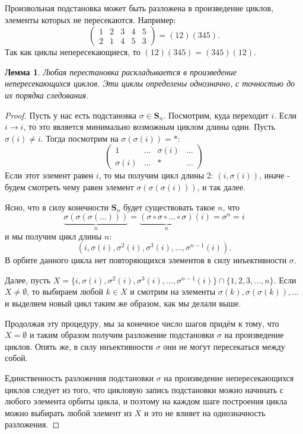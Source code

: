 \documentclass{article}
\newtheorem{lemma}{Лемма}[section]
\begin{document}
Произвольная подстановка может быть разложена в произведение циклов, элементы которых не пересекаются. Например:
\[
    \begin{pmatrix}
        1 & 2 & 3 & 4 & 5 \\
        2 & 1 & 4 & 5 & 3
    \end{pmatrix}
    = (12)(345).
\]
Так как циклы непересекающиеся, то $(12)(345) = (345)(12)$.

\begin{lemma} \label{qxtx}
    Любая перестановка раскладывается в произведение непересекающихся циклов. Эти циклы определены однозначно, с точностью до их порядка следования.
\end{lemma}
\begin{proof}
    Пусть у нас есть подстановка $\sigma \in \mathbf{S}_n$. Посмотрим, куда переходит $i$. Если $i \rightarrow i$, то это является минимально возможным циклом длины один. Пусть $\sigma(i) \neq i$. Тогда посмотрим на $\sigma(\sigma(i)) = *$:
    \[
        \begin{pmatrix}
            1 & \dots & \sigma(i) & \dots  \\
            \sigma(i) & \dots & * & \dots
        \end{pmatrix}
    \]
    Если этот элемент равен $i$, то мы получим цикл длины 2: $(i, \sigma(i))$, иначе - будем смотреть чему равен элемент $\sigma(\sigma(\sigma(i)))$, и так далее.

    Ясно, что в силу конечности $\textbf{S}_n$ будет существовать такое $n$, что $$ \underbrace{\sigma(\sigma(\sigma( \ldots )))}_{n} = \underbrace{(\sigma \circ \sigma \circ \ldots \circ \sigma)}_{n}(i) = \sigma^n = i $$ и мы получим цикл длины $n$: $$ (i, \sigma(i), \sigma^2(i), \sigma^3(i), \ldots, \sigma^{n - 1}(i)). $$
    В орбите данного цикла нет повторяющихся элементов в силу инъективности $\sigma$.

    Далее, пусть $X = \{ i, \sigma(i), \sigma^2(i), \sigma^3(i), \ldots, \sigma^{n - 1}(i) \} \cap \{1, 2, 3, \ldots, n\}$. Если $X \neq \emptyset$, то выбираем любой $k \in X$ и смотрим на элементы $\sigma(k), \sigma(\sigma(k)), \ldots$ и выделяем новый цикл таким же образом, как мы делали выше.

    Продолжая эту процедуру, мы за конечное число шагов придём к тому, что $X = \emptyset$ и таким образом получим разложение подстановки $\sigma$ на произведение циклов. Опять же, в силу инъективности $\sigma$ они не могут пересекаться между собой.

    Единственность разложения подстановки $\sigma$ на произведение непересекающихся циклов следует из того, что цикловую запись подстановки можно начинать с любого элемента орбиты цикла, и поэтому на каждом шаге построения цикла можно выбирать любой элемент из $X$ и это не влияет на однозначность разложения.
\end{proof}
\end{document}
